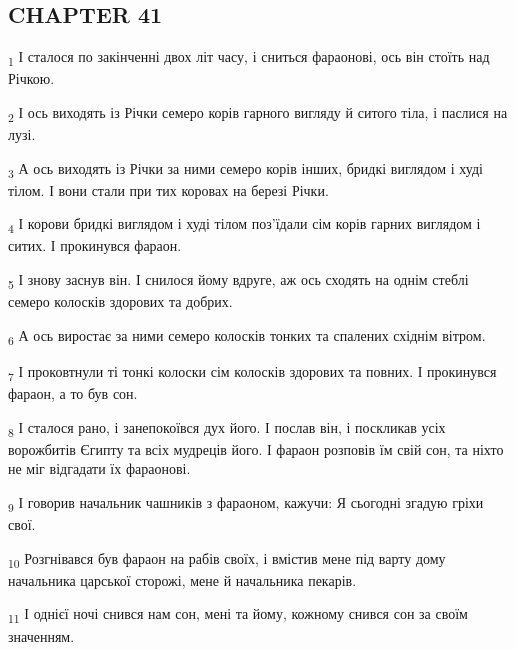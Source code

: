 \subsection{CHAPTER 41}
\begin{tcolorbox}
\textsubscript{1} І сталося по закінченні двох літ часу, і сниться фараонові, ось він стоїть над Річкою.
\end{tcolorbox}
\begin{tcolorbox}
\textsubscript{2} І ось виходять із Річки семеро корів гарного вигляду й ситого тіла, і паслися на лузі.
\end{tcolorbox}
\begin{tcolorbox}
\textsubscript{3} А ось виходять із Річки за ними семеро корів інших, бридкі виглядом і худі тілом. І вони стали при тих коровах на березі Річки.
\end{tcolorbox}
\begin{tcolorbox}
\textsubscript{4} І корови бридкі виглядом і худі тілом поз'їдали сім корів гарних виглядом і ситих. І прокинувся фараон.
\end{tcolorbox}
\begin{tcolorbox}
\textsubscript{5} І знову заснув він. І снилося йому вдруге, аж ось сходять на однім стеблі семеро колосків здорових та добрих.
\end{tcolorbox}
\begin{tcolorbox}
\textsubscript{6} А ось виростає за ними семеро колосків тонких та спалених східнім вітром.
\end{tcolorbox}
\begin{tcolorbox}
\textsubscript{7} І проковтнули ті тонкі колоски сім колосків здорових та повних. І прокинувся фараон, а то був сон.
\end{tcolorbox}
\begin{tcolorbox}
\textsubscript{8} І сталося рано, і занепокоївся дух його. І послав він, і поскликав усіх ворожбитів Єгипту та всіх мудреців його. І фараон розповів їм свій сон, та ніхто не міг відгадати їх фараонові.
\end{tcolorbox}
\begin{tcolorbox}
\textsubscript{9} І говорив начальник чашників з фараоном, кажучи: Я сьогодні згадую гріхи свої.
\end{tcolorbox}
\begin{tcolorbox}
\textsubscript{10} Розгнівався був фараон на рабів своїх, і вмістив мене під варту дому начальника царської сторожі, мене й начальника пекарів.
\end{tcolorbox}
\begin{tcolorbox}
\textsubscript{11} І однієї ночі снився нам сон, мені та йому, кожному снився сон за своїм значенням.
\end{tcolorbox}

